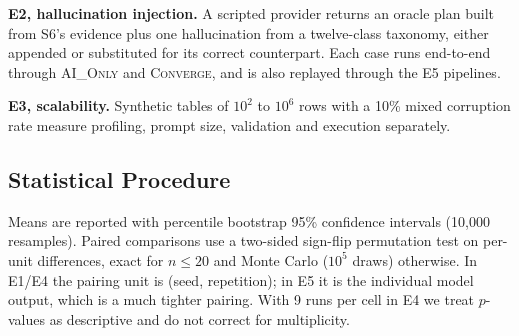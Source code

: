 \noindent\textbf{E2, hallucination injection.} A scripted provider returns an oracle plan built from S6's evidence plus one hallucination from a twelve-class taxonomy, either appended or substituted for its correct counterpart. Each case runs end-to-end through \textsc{AI\_Only} and \textsc{Converge}, and is also replayed through the E5 pipelines.

\noindent\textbf{E3, scalability.} Synthetic tables of $10^2$ to $10^6$ rows with a 10\% mixed corruption rate measure profiling, prompt size, validation and execution separately.

\subsection{Statistical Procedure}
Means are reported with percentile bootstrap 95\% confidence intervals (10{,}000 resamples). Paired comparisons use a two-sided sign-flip permutation test on per-unit differences, exact for $n\le20$ and Monte Carlo ($10^5$ draws) otherwise. In E1/E4 the pairing unit is (seed, repetition); in E5 it is the individual model output, which is a much tighter pairing. With 9 runs per cell in E4 we treat $p$-values as descriptive and do not correct for multiplicity.
